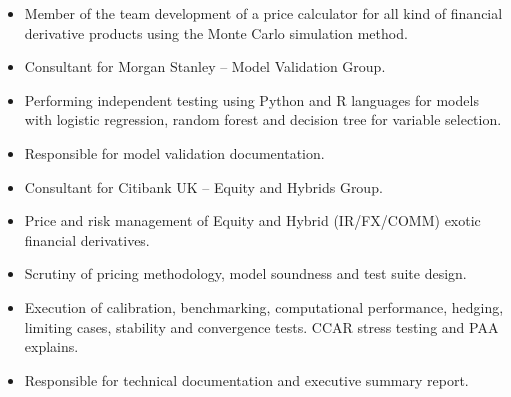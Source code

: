 \documentclass[10pt,a4paper,ragged2e]{altacv}
\begin{document}

\begin{fullwidth}
\makecvheader
\end{fullwidth}




\begin{itemize}
\item Member of the team development of a price calculator for all kind of financial derivative 
products using the Monte Carlo simulation method.
\end{itemize}

\divider

\begin{itemize}
\item Consultant for Morgan Stanley – Model Validation Group.
\item Performing independent testing using Python and R languages for 
models with logistic regression, random forest and decision tree for variable selection.
\item Responsible for model validation documentation. 

\end{itemize}

\divider

\begin{itemize}
\item Consultant for Citibank UK – Equity and Hybrids Group.
\item Price and risk management of Equity and Hybrid (IR/FX/COMM) exotic financial derivatives.
\item Scrutiny of pricing methodology, model soundness and test suite design. 
\item Execution of calibration, benchmarking, computational performance, hedging, limiting cases, 
stability and convergence tests. CCAR stress testing and PAA explains. 
\item Responsible for technical documentation and executive summary report.
\end{itemize}
\end{document}
